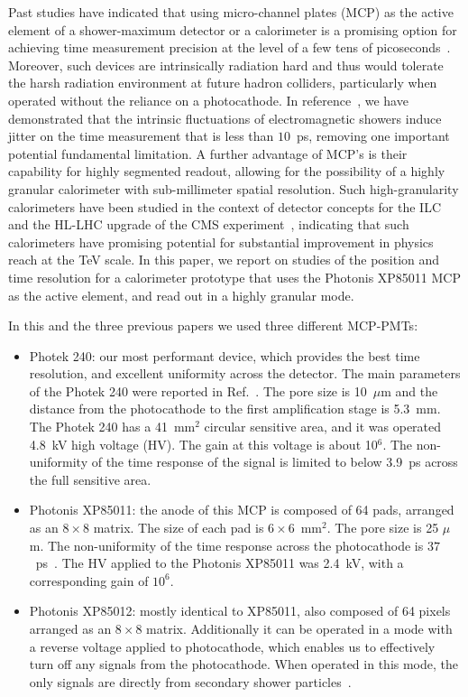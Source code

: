 \documentclass[12pt]{article}
\begin{document}
Past studies have indicated that using micro-channel plates (MCP) as the active
element of a shower-maximum detector or a calorimeter is a promising option for
achieving time measurement precision at the level of a few tens of
picoseconds~\cite{MCPFastCaloNIMA,Ronzhin:2015pba,Ronzhin2015288,Brianza2015216}. 
Moreover, such devices are intrinsically radiation hard and thus would tolerate the harsh
radiation environment at future hadron colliders, particularly when operated 
without the reliance on a photocathode. 
In reference~\cite{Ronzhin2015288}, we have demonstrated that the intrinsic 
fluctuations of electromagnetic showers induce jitter on the time measurement
that is less than $10$~ps, removing one important potential fundamental limitation.
A further advantage of MCP's is their capability for highly segmented readout, allowing for 
the possibility of a highly granular calorimeter with sub-millimeter spatial resolution. Such
high-granularity calorimeters have been studied in the context of detector
concepts for the ILC~\cite{Grondin:2010fe} and the HL-LHC upgrade of the CMS 
experiment~\cite{Butler:2020886}, indicating that such calorimeters have promising 
potential for substantial improvement in physics reach at the TeV scale. In this 
paper, we report on studies of the position and time resolution for a calorimeter prototype
that uses the Photonis XP85011 MCP as the active element, and read out in a highly granular 
mode.

In this and the three previous papers we used three different MCP-PMTs:
\begin{itemize}
\item Photek 240: our most performant device, which provides the best
      time resolution, and excellent uniformity across the detector. The main parameters
      of the Photek 240 were reported in Ref.~\cite{MCPFastCaloNIMA}. The pore
      size is 10~$\mu$m and the distance from the photocathode to the first
      amplification stage is 5.3~mm. The Photek 240 has a 41~mm$^2$ circular
      sensitive area, and it was operated 4.8~kV high voltage (HV). The gain at
      this voltage is about 10$^6$. The non-uniformity of the time response of the signal 
      is limited to below 3.9~ps across the full sensitive area.
\item Photonis XP85011: the anode of this MCP is composed of 64 pads, arranged
      as an $8\times8$ matrix. The size of each pad is $6\times6$~$\mathrm{mm}^{2}$. 
      The pore size is 25 $\mu$m. The non-uniformity  of the time response across the photocathode
      is $37$~ps~\cite{MCPFastCaloNIMA, Ronzhin2015288}. The HV applied to the Photonis XP85011 
      was 2.4~kV, with a corresponding gain of $10^6$. 
\item Photonis XP85012: mostly identical to XP85011, also composed of 64 pixels arranged as
      an $8\times8$ matrix. Additionally it can be operated in a mode with a reverse voltage applied 
      to photocathode, which enables us to effectively turn off any signals from 
      the photocathode. When operated in this mode, the only signals are 
      directly from secondary shower particles~\cite{Ronzhin:2015pba}.  
\end{itemize}
\end{document}
